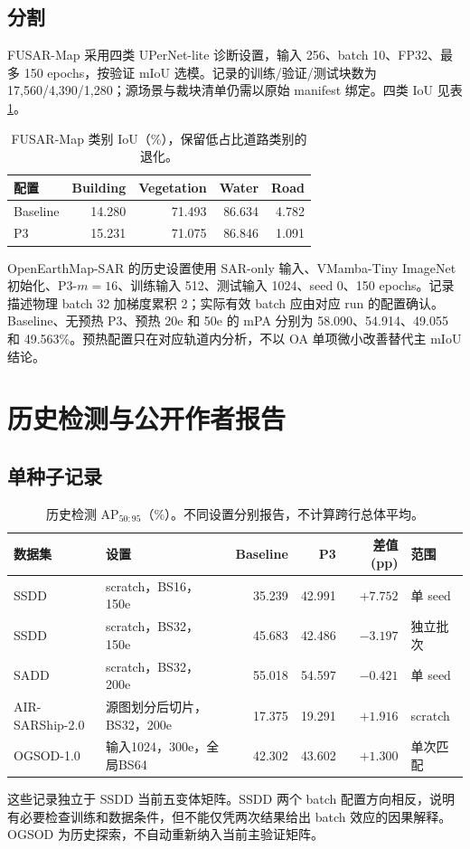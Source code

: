\documentclass[UTF8,11pt,a4paper,fontset=fandol]{ctexart}
\newcommand{\ap}{\mathrm{AP}}
\begin{document}
\subsection{分割}
FUSAR-Map 采用四类 UPerNet-lite 诊断设置，输入 256、batch 10、FP32、最多 150 epochs，按验证 mIoU 选模。记录的训练/验证/测试块数为 17,560/4,390/1,280；源场景与裁块清单仍需以原始 manifest 绑定。四类 IoU 见表\ref{tab:classiou}。

\begin{table}[H]\centering\small
\caption{FUSAR-Map 类别 IoU（\%），保留低占比道路类别的退化。}
\label{tab:classiou}
\begin{tabular}{lrrrr}
\toprule
配置 & Building & Vegetation & Water & Road\\
\midrule
Baseline & 14.280 & 71.493 & 86.634 & 4.782\\
P3 & 15.231 & 71.075 & 86.846 & 1.091\\
\bottomrule
\end{tabular}
\end{table}

OpenEarthMap-SAR 的历史设置使用 SAR-only 输入、VMamba-Tiny ImageNet 初始化、P3-$m=16$、训练输入 512、测试输入 1024、seed 0、150 epochs。记录描述物理 batch 32 加梯度累积 2；实际有效 batch 应由对应 run 的配置确认。Baseline、无预热 P3、预热 20e 和 50e 的 mPA 分别为 58.090、54.914、49.055 和 49.563\%。预热配置只在对应轨道内分析，不以 OA 单项微小改善替代主 mIoU 结论。
\FloatBarrier

\section{历史检测与公开作者报告}\label{app:history}
\subsection{单种子记录}
\begin{table}[H]\centering\small
\caption{历史检测 $\ap_{50:95}$（\%）。不同设置分别报告，不计算跨行总体平均。}
\label{tab:history}
\begin{tabularx}{\linewidth}{P{2.2cm}P{4.0cm}rrrY}
\toprule
数据集 & 设置 & Baseline & P3 & 差值 (pp) & 范围\\
\midrule
SSDD & scratch，BS16，150e & 35.239 & 42.991 & $+7.752$ & 单 seed\\
SSDD & scratch，BS32，150e & 45.683 & 42.486 & $-3.197$ & 独立批次\\
SADD & scratch，BS32，200e & 55.018 & 54.597 & $-0.421$ & 单 seed\\
AIR-SARShip-2.0 & 源图划分后切片，BS32，200e & 17.375 & 19.291 & $+1.916$ & scratch\\
OGSOD-1.0 & 输入1024，300e，全局BS64 & 42.302 & 43.602 & $+1.300$ & 单次匹配\\
\bottomrule
\end{tabularx}
\end{table}
这些记录独立于 SSDD 当前五变体矩阵。SSDD 两个 batch 配置方向相反，说明有必要检查训练和数据条件，但不能仅凭两次结果给出 batch 效应的因果解释。OGSOD 为历史探索，不自动重新纳入当前主验证矩阵。
\end{document}
